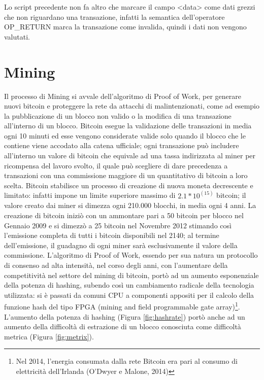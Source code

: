 Lo script precedente non fa altro che marcare il campo <data> come dati grezzi che non riguardano una transazione, infatti la semantica dell’operatore OP\_RETURN marca la transazione come invalida, quindi i dati non vengono valutati.

\section{Mining}
\label{sec:miningbitcoin}

Il processo di Mining si avvale dell’algoritmo di Proof of Work, per generare nuovi bitcoin e proteggere la rete da attacchi di malintenzionati, come ad esempio la pubblicazione di un blocco non valido o la modifica di una transazione all’interno di un blocco.
Bitcoin esegue la validazione delle transazioni in media ogni 10 minuti ed esse vengono considerate valide solo quando il blocco che le contiene viene accodato alla catena ufficiale; ogni transazione può includere all’interno un valore di bitcoin che equivale ad una tassa indirizzata al miner per ricompensa del lavoro svolto, il quale può scegliere di dare precedenza a transazioni con una commissione maggiore di un quantitativo di bitcoin a loro scelta.
Bitcoin stabilisce un processo di creazione di nuova moneta decrescente e limitato: infatti impone un limite superiore massimo di \(2.1 * 10^(15)\) bitcoin; il valore creato dai miner si dimezza ogni 210.000 blocchi, in media ogni 4 anni.
La creazione di bitcoin iniziò con un ammontare pari a 50 bitcoin per blocco nel Gennaio 2009 e si dimezzò a 25 bitcoin nel Novembre 2012 stimando così l’emissione completa di tutti i bitcoin disponibili nel 2140; al termine dell’emissione, il guadagno di ogni miner sarà esclusivamente il valore della commissione.
L’algoritmo di Proof of Work, essendo per sua natura un protocollo di consenso ad alta intensità, nel corso degli anni, con l’aumentare della competitività nel settore del mining di bitcoin, portò ad un aumento esponenziale della potenza di hashing, subendo così un cambiamento radicale della tecnologia utilizzata: si è passati da comuni CPU a componenti appositi per il calcolo della funzione hash del tipo FPGA (mining and field programmable gate array)\footnote{Nel 2014, l'energia consumata dalla rete Bitcoin era pari al consumo di elettricità dell'Irlanda (O'Dwyer e Malone, 2014)}.
L’aumento della potenza di hashing (Figura \ref{fig:hashrate}) portò anche ad un aumento della difficoltà di estrazione di un blocco conosciuta come difficoltà metrica (Figura \ref{fig:metrix}).

